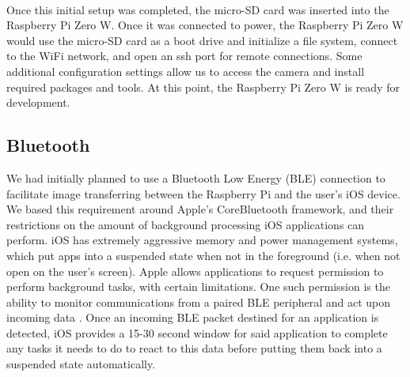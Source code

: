 \documentclass[a4paper,11pt]{article}
\begin{document}
\

\noindent
Once this initial setup was completed, the micro-SD card was inserted into the Raspberry Pi Zero W. Once it was connected to power, the Raspberry Pi Zero W would use the micro-SD card as a boot drive and initialize a file system, connect to the WiFi network, and open an ssh port for remote connections. Some additional configuration settings allow us to access the camera and install required packages and tools. At this point, the Raspberry Pi Zero W is ready for development.

\subsection{Bluetooth}
\label{bluetooth}
We had initially planned to use a Bluetooth Low Energy (BLE) connection to facilitate image transferring between the Raspberry Pi and the user's iOS device. We based this requirement around Apple's CoreBluetooth framework, and their restrictions on the amount of background processing iOS applications can perform. iOS has extremely aggressive memory and power management systems, which put apps into a suspended state when not in the foreground (i.e. when not open on the user's screen). Apple allows applications to request permission to perform background tasks, with certain limitations. One such permission is the ability to monitor communications from a paired BLE peripheral and act upon incoming data \cite{apple-bluetooth}. Once an incoming BLE packet destined for an application is detected, iOS provides a 15-30 second window for said application to complete any tasks it needs to do to react to this data before putting them back into a suspended state automatically.

\
\end{document}
